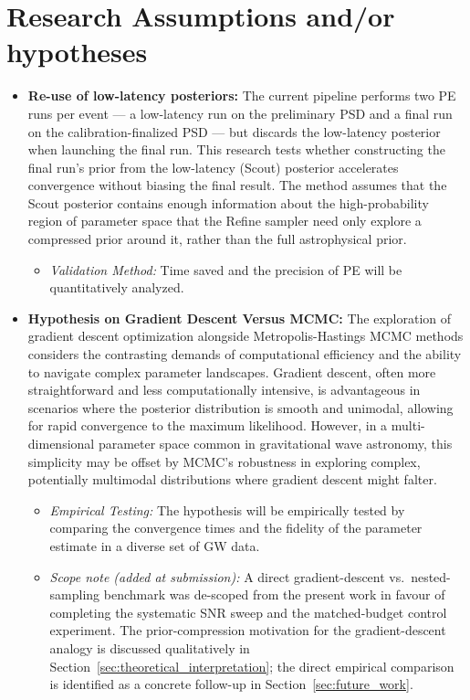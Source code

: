 \documentclass[12pt]{article}
\begin{document}

\section{Research Assumptions and/or hypotheses }

\begin{itemize}
 \item \textbf{Re-use of low-latency posteriors:} The current pipeline performs two PE runs per event — a low-latency run on the preliminary PSD and a final run on the calibration-finalized PSD — but discards the low-latency posterior when launching the final run. This research tests whether constructing the final run's prior from the low-latency (Scout) posterior accelerates convergence without biasing the final result. The method assumes that the Scout posterior contains enough information about the high-probability region of parameter space that the Refine sampler need only explore a compressed prior around it, rather than the full astrophysical prior.
  \begin{itemize}
    \item \emph{Validation Method:} Time saved and the precision of PE will be quantitatively analyzed.
  \end{itemize}



    \item \textbf{Hypothesis on Gradient Descent Versus MCMC:} The exploration of gradient descent optimization alongside Metropolis-Hastings MCMC methods considers the contrasting demands of computational efficiency and the ability to navigate complex parameter landscapes. Gradient descent, often more straightforward and less computationally intensive, is advantageous in scenarios where the posterior distribution is smooth and unimodal, allowing for rapid convergence to the maximum likelihood. However, in a multi-dimensional parameter space common in gravitational wave astronomy, this simplicity may be offset by MCMC's robustness in exploring complex, potentially multimodal distributions where gradient descent might falter.

  \begin{itemize}
    \item \emph{Empirical Testing:} The hypothesis will be empirically tested by comparing the convergence times and the fidelity of the parameter estimate in a diverse set of GW data.
    \item \emph{Scope note (added at submission):} A direct gradient-descent vs.\ nested-sampling benchmark was de-scoped from the present work in favour of completing the systematic SNR sweep and the matched-budget control experiment. The prior-compression motivation for the gradient-descent analogy is discussed qualitatively in Section~\ref{sec:theoretical_interpretation}; the direct empirical comparison is identified as a concrete follow-up in Section~\ref{sec:future_work}.
  \end{itemize}
\end{itemize}
\end{document}
